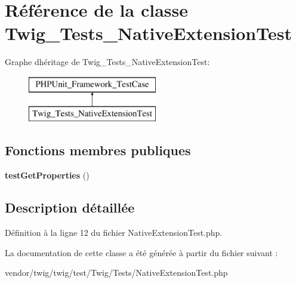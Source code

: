 \hypertarget{class_twig___tests___native_extension_test}{}\section{Référence de la classe Twig\+\_\+\+Tests\+\_\+\+Native\+Extension\+Test}
\label{class_twig___tests___native_extension_test}
Graphe d\textquotesingle{}héritage de Twig\+\_\+\+Tests\+\_\+\+Native\+Extension\+Test\+:\begin{figure}[H]
\begin{center}
\leavevmode
\includegraphics[height=2.000000cm]{class_twig___tests___native_extension_test}
\end{center}
\end{figure}
\subsection*{Fonctions membres publiques}
\begin{DoxyCompactItemize}
\item 
{\bfseries test\+Get\+Properties} ()\hypertarget{class_twig___tests___native_extension_test_a33518e05d8a0ae8263c243411ec84154}{}\label{class_twig___tests___native_extension_test_a33518e05d8a0ae8263c243411ec84154}

\end{DoxyCompactItemize}


\subsection{Description détaillée}


Définition à la ligne 12 du fichier Native\+Extension\+Test.\+php.



La documentation de cette classe a été générée à partir du fichier suivant \+:\begin{DoxyCompactItemize}
\item 
vendor/twig/twig/test/\+Twig/\+Tests/Native\+Extension\+Test.\+php\end{DoxyCompactItemize}
